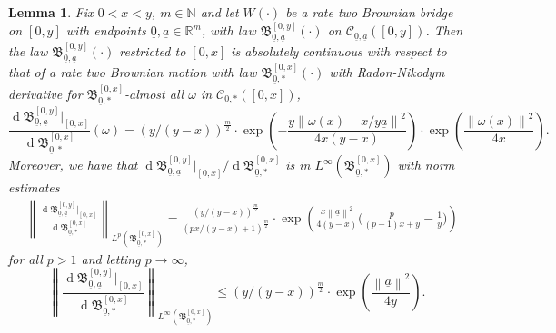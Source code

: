 \documentclass[11pt, reqno]{amsart}
\numberwithin{equation}{section}
\newcounter{dummy} \numberwithin{dummy}{section}
\newtheorem{lemma}[dummy]{Lemma}
\newcommand{\N}{\ensuremath{\mathbb{N}}}
\newcommand{\R}{\ensuremath{\mathbb{R}}}
\newcommand{\norm}[1]{\left\lVert#1\right\rVert}
\newcommand{\diff}{\ensuremath{\operatorname{d}\!}}
\begin{document}
\begin{lemma}\label{lemma: brownian bridge comparison lemma}
    Fix $0<x<y$, $m\in \N$ and let $W(\cdot)$ be a rate two Brownian bridge on $[0, y]$ with endpoints $\underline{0}, \underline{a}\in \R^m$, with law $\mathfrak{B}^{[0, y]}_{\underline{0}, \underline{a}}(\cdot)$ on $\mathscr{C}_{\underline{0}, \underline{a}}([0, y])$. Then the law $\mathfrak{B}^{[0, y]}_{\underline{0}, \underline{a}}(\cdot)$ restricted to $[0,x]$ is absolutely continuous with respect to that of a rate two Brownian motion with law $\mathfrak{B}^{[0, x]}_{\underline{0}, *}(\cdot)$ with Radon-Nikodym derivative for $\mathfrak{B}^{[0, x]}_{\underline{0}, *}$-almost all $\omega$ in $\mathscr{C}_{\underline{0},*}([0, x])$,
    \begin{equation*}
        \frac{\diff\mathfrak{B}^{[0, y]}_{\underline{0}, \underline{a}}|_{[0,x]}}{\diff\mathfrak{B}^{[0, x]}_{\underline{0}, *}}(\omega) = (y/(y-x))^{\frac{m}{2}}\cdot\exp\left(-\frac{y\norm{\omega(x)-x/y\underline{a}}^2}{4x(y-x)}\right)\cdot \exp\left(\frac{\norm{\omega(x)}^2}{4x}\right).
     \end{equation*}
        Moreover, we have that $\diff\mathfrak{B}^{[0, y]}_{\underline{0}, \underline{a}}|_{[0,x]}/\diff\mathfrak{B}^{[0, x]}_{\underline{0}, *}$ is in $L^\infty(\mathfrak{B}^{[0, x]}_{\underline{0}, *})$ with norm estimates
        \begin{equation*}
            \begin{array}{cc}
                 & \norm{\frac{\diff\mathfrak{B}^{[0, y]}_{\underline{0}, \underline{a}}|_{[0,x]}}{\diff\mathfrak{B}^{[0, x]}_{\underline{0}, *}}}_{L^p\left(\mathfrak{B}^{[0, x]}_{\underline{0}, *}\right)} = \frac{(y/(y-x))^{\frac{m}{2}}}{(px/(y-x)+1)^{\frac{m}{2}}}\cdot \exp\left({\frac{x\norm{\underline{a}}^2}{4(y-x)}\big(\frac{p}{(p-1)x+y}-\frac{1}{y}\big)}\right)
            \end{array}
        \end{equation*}
        for all $p>1$ and letting $p\to \infty$,
    \begin{equation*}
        \norm{\frac{\diff\mathfrak{B}^{[0, y]}_{\underline{0}, \underline{a}}|_{[0,x]}}{\diff\mathfrak{B}^{[0, x]}_{\underline{0}, *}}}_{L^\infty\left(\mathfrak{B}^{[0, x]}_{\underline{0}, *}\right)} \le (y/(y-x))^{\frac{m}{2}}\cdot \exp\left({\frac{\norm{\underline{a}}^2}{4y}}\right). 
    \end{equation*}
\end{lemma}
\end{document}
